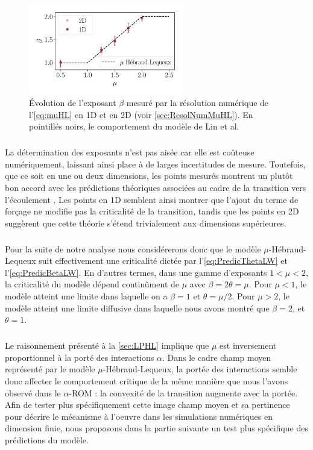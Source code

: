 \begin{figure}[h]
	\centering
	\includegraphics[width=0.6\textwidth]{Chapitre3/Figures/Interpretation/beta_alpha_LevyHL2D.pdf}
	\caption{Évolution de l'exposant $\beta$ mesuré par la résolution numérique de l'\autoref{eq:muHL} en 1D et en 2D (voir \autoref{sec:ResolNumMuHL}). En pointillés noirs, le comportement du modèle de Lin et al. \cite{lin_microscopic_2018}}
	\label{fig:LHLNum}
\end{figure}

\subparagraph{}La détermination des exposants n'est pas aisée car elle est coûteuse numériquement, laissant ainsi place à de larges incertitudes de mesure. Toutefois, que ce soit en une ou deux dimensions, les points mesurés montrent un plutôt bon accord avec les prédictions théoriques associées au cadre de la transition vers l'écoulement \cite{lin_microscopic_2018}. Les points en 1D semblent ainsi montrer que l'ajout du terme de forçage ne modifie pas la criticalité de la transition, tandis que les points en 2D suggèrent que cette théorie s'étend trivialement aux dimensions supérieures.

\subparagraph{}Pour la suite de notre analyse nous considérerons donc que le modèle $\mu$-Hébraud-Lequeux suit effectivement une criticalité dictée par l'\autoref{eq:PredicThetaLW} et l'\autoref{eq:PredicBetaLW}. En d'autres termes, dans une gamme d'exposants $1<\mu<2$, la criticalité du modèle dépend continûment de $\mu$ avec $\beta = 2\theta = \mu$. Pour $\mu < 1$, le modèle atteint une limite dans laquelle on a $\beta = 1$ et $\theta = \mu/2$. Pour $\mu>2$, le modèle atteint une limite diffusive dans laquelle nous avons montré que $\beta = 2$, et $\theta = 1$.

\subparagraph{}Le raisonnement présenté à la \autoref{sec:LPHL} implique que $\mu$ est inversement proportionnel à la porté des interactions $\alpha$. Dans le cadre champ moyen représenté par le modèle $\mu$-Hébraud-Lequeux, la portée des interactions semble donc affecter le comportement critique de la même manière que nous l'avons observé dans le $\alpha$-ROM : la convexité de la transition augmente avec la portée. Afin de tester plus spécifiquement cette image champ moyen et sa pertinence pour décrire le mécanisme à l'oeuvre dans les simulations numériques en dimension finie, nous proposons dans la partie suivante un test plus spécifique des prédictions du modèle.


